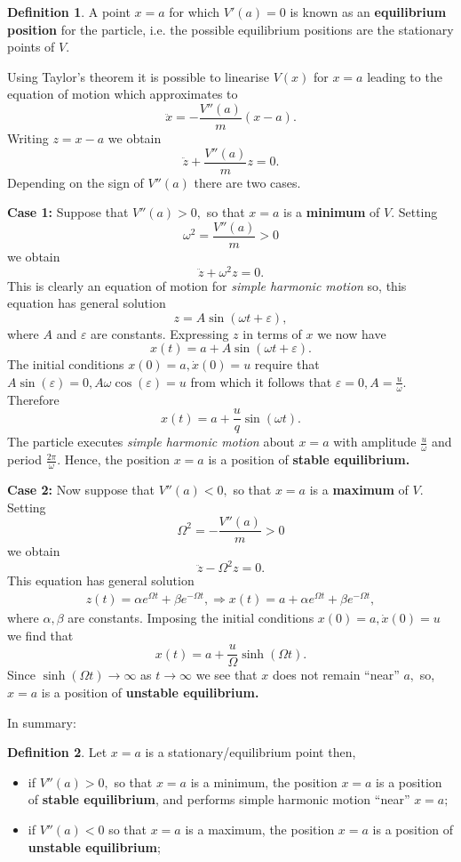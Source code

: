 \documentclass[12pt, a4paper]{article}
\newcommand{\f}[2]{\frac{#1}{#2}}
\newcommand{\imply}{\Rightarrow}
\theoremstyle{definition}
\newtheorem{definition}{Definition}[section]
\theoremstyle{plain}
\begin{document}
\begin{definition}
A point $x=a$ for which $V'(a)=0$ is known as an \textbf{equilibrium position} for the particle, i.e. the possible equilibrium positions are the stationary points of $V.$
\end{definition}

Using Taylor's theorem it is possible to linearise $V(x)$ for $x=a$ leading to the equation of motion which approximates to $$\ddot{x}=-\f{V''(a)}{m}(x-a).$$ Writing $z=x-a$ we obtain $$\ddot{z}+\f{V''(a)}{m}z=0.$$ Depending on the sign of $V''(a)$ there are two cases.

\textbf{Case 1:} Suppose that $V''(a)>0,$ so that $x=a$ is a \textbf{minimum} of $V$. Setting $$\omega^2=\f{V''(a)}{m}>0$$ we obtain $$\ddot{z}+\omega^2z=0.$$ This is clearly an equation of motion for \textit{simple harmonic motion} so, this equation has general solution $$z=A\sin(\omega t+\varepsilon),$$ where $A$ and $\varepsilon$ are constants. Expressing $z$ in terms of $x$ we now have $$x(t)=a+A\sin(\omega t+\varepsilon).$$ The initial conditions $x(0)=a, \dot{x}(0)=u$ require that $A\sin(\varepsilon)=0, A\omega\cos(\varepsilon)=u$ from which it follows that $\varepsilon=0, A=\f{u}{\omega}.$ Therefore $$x(t)=a+\f{u}{q}\sin(\omega t).$$ The particle executes \textit{simple harmonic motion} about $x=a$ with amplitude $\f{u}{\omega}$ and period $\f{2\pi}{\omega}.$ Hence, the position $x=a$ is a position of \textbf{stable equilibrium.} 

\textbf{Case 2:} Now suppose that $V''(a) < 0,$ so that $x = a$ is a \textbf{maximum} of $V.$ Setting $$\Omega^2=-\f{V''(a)}{m}>0$$ we obtain $$\ddot{z}-\Omega^2z=0.$$ This equation has general solution $$\begin{aligned}
z(t)=\alpha e^{\Omega t}+\beta e^{-\Omega t},
\imply x(t)=a+\alpha e^{\Omega t}+\beta e^{-\Omega t},
\end{aligned}$$ where $\alpha, \beta$ are constants. Imposing the initial conditions $x(0)=a, \dot{x}(0)=u$ we find that $$x(t)=a+\f{u}{\Omega}\sinh(\Omega t).$$ Since $\sinh(\Omega t) \to \infty$ as $t\to \infty$ we see that $x$ does not remain ``near'' $a,$ so, $x=a$ is a position of \textbf{unstable equilibrium.}

In summary: 

\begin{definition}
Let $x=a$ is a stationary/equilibrium point then, 
\begin{itemize}

	\item if $V''(a)>0,$ so that $x=a$ is a minimum, the position $x=a$ is a position of \textbf{stable equilibrium}, and performs simple harmonic motion ``near'' $x=a;$ 

	\item if $V''(a)<0$ so that $x=a$ is a maximum, the position $x=a$ is a position of \textbf{unstable equilibrium};

\end{itemize}
\end{definition}
\end{document}
